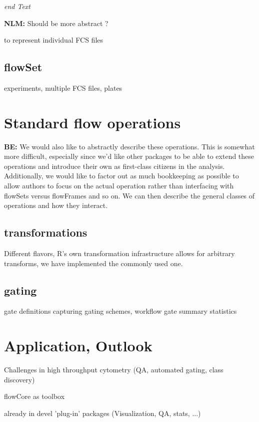 \documentclass[12pt]{article}
\begin{document}
\textit{end Text}

{\bf NLM:} Should be more abstract ? 


to represent individual FCS files

\subsection{flowSet} 
experiments, multiple FCS files, plates


\section{Standard flow operations}
{\bf BE:} We would also like to abstractly describe these operations. This is
somewhat more difficult, especially since we'd like other packages to
be able to extend these operations and introduce their own as
first-class citizens in the analysis. Additionally, we would like to
factor out as much bookkeeping as possible to allow authors to focus
on the actual operation rather than interfacing with flowSets versus
flowFrames and so on. We can then describe the general classes of
operations and how they interact.

\subsection{transformations}
Different flavors, R's own transformation infrastructure allows for
arbitrary transforms, we have implemented the commonly used one.

\subsection{gating}
gate definitions
capturing gating schemes, workflow
gate summary statistics


\section{Application, Outlook}
Challenges in high throughput cytometry
(QA, automated gating, class discovery) 

flowCore as toolbox

already in devel 'plug-in' packages (Visualization, QA, stats, ...)
\end{document}
